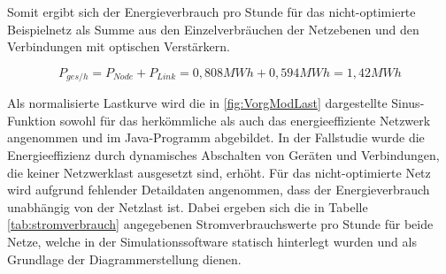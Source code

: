 Somit ergibt sich der Energieverbrauch pro Stunde für das nicht-optimierte Beispielnetz als Summe aus den Einzelverbräuchen der Netzebenen und den Verbindungen mit optischen Verstärkern.

 \begin{equation}
P_{ges/h} = P_{Node} + P_{Link} = 0,808 MWh + 0,594 MWh = 1,42 MWh
 \end{equation}


Als normalisierte Lastkurve wird die in \ref{fig:VorgModLast} dargestellte Sinus-Funktion sowohl für das her\-kömm\-liche als auch das energieeffiziente Netzwerk angenommen und im Java-Programm abgebildet. In der Fallstudie wurde die Energieeffizienz durch dynamisches Abschalten von Geräten und Verbindungen, die keiner Netzwerklast ausgesetzt sind, erhöht.\cite[3]{Chiaraviglio2009} Für das nicht-optimierte Netz wird aufgrund fehlender Detaildaten angenommen, dass der Energieverbrauch unabhängig von der Netzlast ist. Dabei ergeben sich die in Tabelle \ref{tab:stromverbrauch} angegebenen Stromverbrauchswerte pro Stunde für beide Netze, welche in der Simulationssoftware statisch hinterlegt wurden und als Grundlage der Diagrammerstellung dienen.

